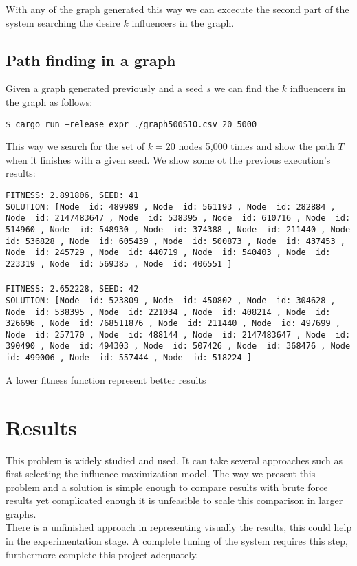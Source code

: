 \documentclass[letter,10pt]{article}
\theoremstyle{definition}
\begin{document}
With any of the graph generated this way we can excecute the second part of the system searching the desire $k$ influencers in the graph.

\subsection{Path finding in a graph}
Given a graph generated previously and a seed $s$ we can find the $k$ influencers in the graph as follows:
\begin{center}
    \texttt{\$ cargo run --release expr ./graph500S10.csv 20 5000 }
\end{center}

This way we search for the set of $k=20$ nodes  5,000 times and show the path $T$ when it finishes with a given seed. We show some ot the previous execution's results:

\texttt{FITNESS: 2.891806, SEED: 41}\\
\texttt{SOLUTION: [Node { id: 489989 }, Node { id: 561193 }, Node { id: 282884 }, Node { id: 2147483647 }, Node { id: 538395 }, Node { id: 610716 }, Node { id: 514960 }, Node { id: 548930 }, Node { id: 374388 }, Node { id: 211440 }, Node { id: 536828 }, Node { id: 605439 }, Node { id: 500873 }, Node { id: 437453 }, Node { id: 245729 }, Node { id: 440719 }, Node { id: 540403 }, Node { id: 223319 }, Node { id: 569385 }, Node { id: 406551 }]}
\\\\
\texttt{FITNESS: 2.652228, SEED: 42}\\
\texttt{SOLUTION: [Node { id: 523809 }, Node { id: 450802 }, Node { id: 304628 }, Node { id: 538395 }, Node { id: 221034 }, Node { id: 408214 }, Node { id: 326696 }, Node { id: 768511876 }, Node { id: 211440 }, Node { id: 497699 }, Node { id: 257170 }, Node { id: 488144 }, Node { id: 2147483647 }, Node { id: 390490 }, Node { id: 494303 }, Node { id: 507426 }, Node { id: 368476 }, Node { id: 499006 }, Node { id: 557444 }, Node { id: 518224 }]}

A lower fitness function represent better results

\section{Results}
This problem is widely studied and used. It can take several approaches such as first selecting the influence maximization model. The way we present this problem and a solution is simple enough to compare results with brute force results yet complicated enough it is unfeasible to scale this comparison in larger graphs. \\

There is a unfinished approach in representing visually the results, this could help in the experimentation stage. A complete tuning of the system requires this step, furthermore complete this project adequately.
\medskip

\nocite{*}

\end{document}
